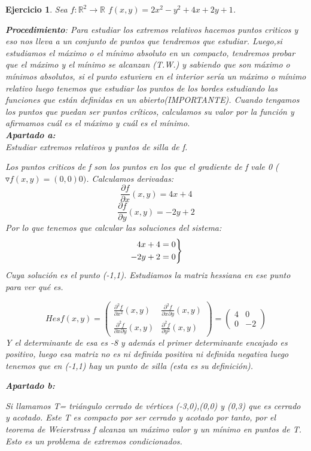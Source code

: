 \documentclass[11pt, a4paper, titlepage]{article}
\newcommand{\R}{\mathbb{R}}
\theoremstyle{exercise-style}
\newtheorem*{ejer}{Ejercicio}
\theoremstyle{theorem-style}
\newenvironment{rcases}
  {\left.\begin{aligned}}
  {\end{aligned}\right\rbrace}
\begin{document}
\begin{ejer}
	Sea $f:\R^2 \to \R$
	$f(x,y) = 2x^2 -y^2 +4x+2y+1$.
	
	\textbf{Procedimiento}: Para estudiar los extremos relativos hacemos puntos criticos y eso nos lleva a un conjunto de puntos que tendremos que estudiar. Luego,si estudiamos el máximo o el mínimo absoluto en un compacto, tendremos probar que el máximo y el mínimo se alcanzan (T.W.) y sabiendo que son máximo o mínimos absolutos, si el punto estuviera en el interior sería un máximo o mínimo relativo luego tenemos que estudiar los puntos de los bordes estudiando las funciones que están definidas en un abierto(IMPORTANTE). Cuando tengamos los puntos que puedan ser puntos críticos, calculamos su valor por la función y afirmamos cuál es el máximo y cuál es el mínimo.\\
	
\textbf{Apartado a:}\\
	 Estudiar extremos relativos y puntos de silla de f.
	
	Los puntos criticos de f son los puntos en los que el gradiente de f vale 0 ( $\triangledown f (x,y) = (0,0)0)$. Calculamos derivadas:
	\[
	\frac{\partial f}{\partial x}(x,y) = 4 x+ 4
	\]\[
	\frac{\partial f}{\partial y}(x,y) = -2y +2
	\]
	Por lo que tenemos que calcular las soluciones del sistema:
	\[
	\begin{rcases}
	4x+4 = 0\\
	-2y+2 = 0
\end{rcases}
	\]
	Cuya solución es el punto (-1,1).
	Estudiamos la matriz hessiana en ese punto para ver qué es.
	
	\[
	Hesf(x,y) = \begin{pmatrix}
 \frac{\partial^2f}{\partial x^2}(x,y) &  \frac{\partial^2f}{\partial x \partial y}(x,y) \\
  \frac{\partial^2f}{\partial x \partial y}(x,y) &  \frac{\partial^2f}{\partial y^2}(x,y)
\end{pmatrix}  =  \begin{pmatrix}
  4& 0 \\
 0 & -2 
\end{pmatrix} 
	\]
	Y el determinante de esa es -8 y además el primer determinante encajado es positivo, luego esa matriz no es ni definida positiva ni definida negativa luego tenemos que en (-1,1) hay un punto de silla (esta es su definición).
	
	\textbf{Apartado b:}
	
	Si llamamos T= triángulo cerrado de vértices (-3,0),(0,0) y (0,3) que es cerrado y acotado. Este T es compacto por ser cerrado y acotado por tanto, por el teorema de Weierstrass f alcanza un máximo valor y un mínimo en puntos de T.
	Esto es un problema de extremos condicionados.
	

\end{ejer}
\end{document}
